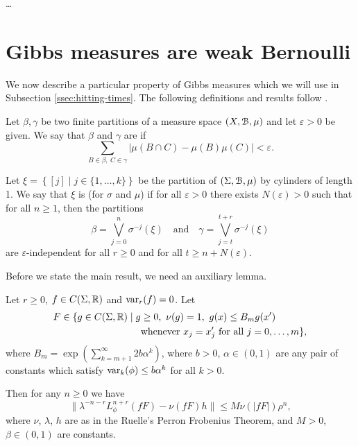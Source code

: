 \dots

\section{Gibbs measures are weak Bernoulli}
We now describe a particular property of Gibbs measures which we will use in Subsection \ref{ssec:hitting-times}. The following definitions and results follow \cite[Section 1.E]{bowen:equilibrium}.

\begin{definition}
	Let $\beta, \gamma$ be two finite partitions of a measure space $(X, \mathcal{B}, \mu)$ and let $\varepsilon > 0$ be given. We say that $\beta$ and $\gamma$ are  if
	\[
		\sum_{B \in \beta,\ C \in \gamma}{|\mu(B \cap C) - \mu(B)\mu(C)|} < \varepsilon.
	\]
\end{definition}

\begin{definition}
	Let $\xi = \left\{[j] \mid j \in \{1, \dots, k\}\right\}$ be the partition of $(\Sigma, \mathcal{B}, \mu)$ by cylinders of length 1. We say that $\xi$ is  (for $\sigma$ and $\mu$) if for all $\varepsilon > 0$ there exists $N(\varepsilon) > 0$ such that for all $n \geq 1$, then the partitions
	\[
		\beta = \bigvee_{j = 0}^n{\sigma^{-j}(\xi)} \quad \text{and} \quad \gamma = \bigvee_{j = t}^{t + r}{\sigma^{-j}(\xi)}
	\]
	are $\varepsilon$-independent for all $r \geq 0$ and for all $t \geq n + N(\varepsilon)$.
\end{definition}

Before we state the main result, we need an auxiliary lemma.

\begin{lemma}\label{bowen:lem-1-12}
	Let $r \geq 0$, $f \in C(\Sigma, \mathbb{R})$ and $\operatorname{var}_r(f) = 0$. Let
	\begin{align*}
		F \in \{g \in C(\Sigma, \mathbb{R}) \mid g & \geq 0,\ \nu(g) = 1,\ g(x) \leq B_m g(x') \\
			& \text{whenever } x_j = x'_j \text{ for all } j = 0, \dots, m\},
	\end{align*}
	where $B_m = \exp\left(\sum_{k = m + 1}^\infty{2b\alpha^k}\right)$, where $b > 0$, $\alpha \in (0, 1)$ are any pair of constants which satisfy $\operatorname{var}_k(\phi) \leq b\alpha^k$ for all $k > 0$.
	
	Then for any $n \geq 0$ we have
	\[
		\|\lambda^{-n - r}L_\phi^{n + r}(fF) - \nu(fF)h\| \leq M\nu(|fF|)\rho^n,
	\]
	where $\nu$, $\lambda$, $h$ are as in the Ruelle's Perron Frobenius Theorem, and $M > 0$, $\beta \in (0, 1)$ are constants.
\end{lemma}

